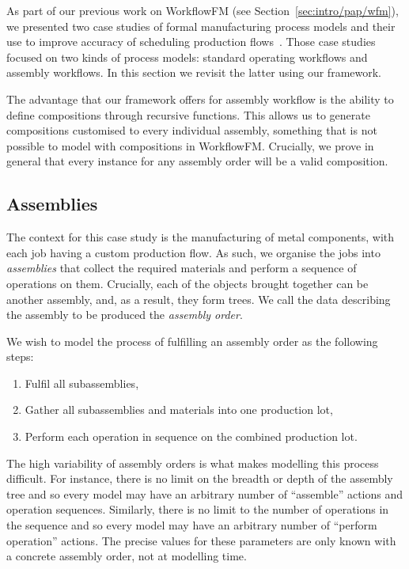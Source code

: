 \documentclass[class=smolathesis,crop=false]{standalone}
\begin{document}
As part of our previous work on WorkflowFM (see Section~\ref{sec:intro/pap/wfm}), we presented two case studies of formal manufacturing process models and their use to improve accuracy of scheduling production flows~\cite{papapa_et_al-2021}.
Those case studies focused on two kinds of process models: standard operating workflows and assembly workflows.
In this section we revisit the latter using our framework.

The advantage that our framework offers for assembly workflow is the ability to define compositions through recursive functions.
This allows us to generate compositions customised to every individual assembly, something that is not possible to model with compositions in WorkflowFM.
Crucially, we prove in general that every instance for any assembly order will be a valid composition.

\subsection{Assemblies}
\label{sec:cases/assembly/context}

The context for this case study is the manufacturing of metal components, with each job having a custom production flow.
As such, we organise the jobs into \emph{assemblies} that collect the required materials and perform a sequence of operations on them.
Crucially, each of the objects brought together can be another assembly, and, as a result, they form trees.
We call the data describing the assembly to be produced the \emph{assembly order}.

We wish to model the process of fulfilling an assembly order as the following steps:
\begin{enumerate}
  \item Fulfil all subassemblies,
  \item Gather all subassemblies and materials into one production lot,
  \item Perform each operation in sequence on the combined production lot.
\end{enumerate}

The high variability of assembly orders is what makes modelling this process difficult.
For instance, there is no limit on the breadth or depth of the assembly tree and so every model may have an arbitrary number of ``assemble'' actions and operation sequences.
Similarly, there is no limit to the number of operations in the sequence and so every model may have an arbitrary number of ``perform operation'' actions.
The precise values for these parameters are only known with a concrete assembly order, not at modelling time.
\end{document}
